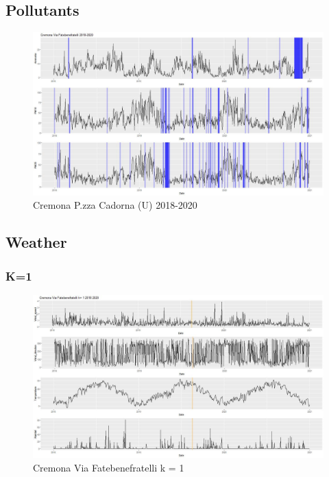 \documentclass{article}
\begin{document}
\subsection{Pollutants}
\begin{figure}[H]
  \centering
  \includegraphics[scale = 0.4]{Picture/Cremona Via Fatebenefratelli 2018-2020.jpeg}
  \caption{Cremona P.zza Cadorna (U) 2018-2020}
  \centering
\end{figure}
\subsection{Weather}
\subsubsection{K=1}
\begin{figure}[H]
  \centering 
  \includegraphics[scale = 0.3]{Picture/1/Cremona Via Fatebenefratelli k= 1 2018 2020 .jpeg}
  \caption{Cremona Via Fatebenefratelli k = 1}
  \centering
\end{figure}
\end{document}
